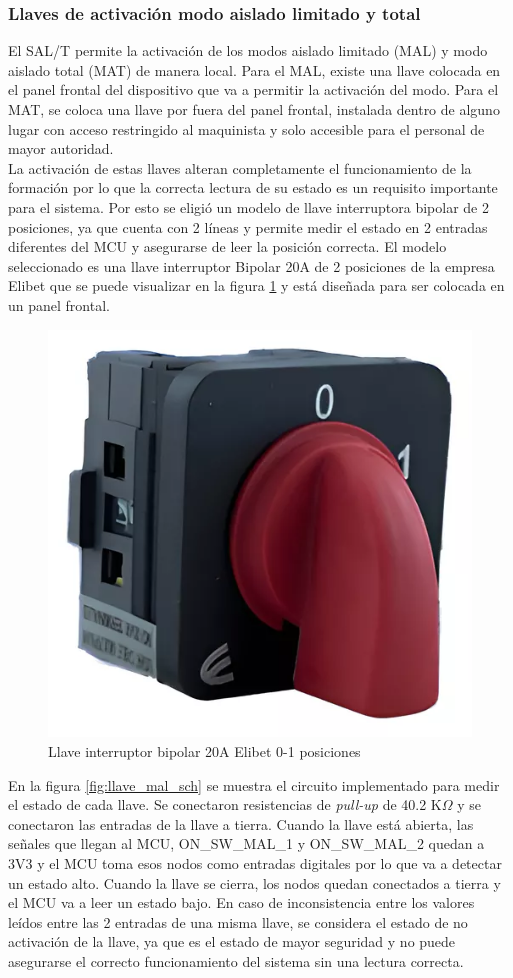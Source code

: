 \subsubsection{Llaves de activación modo aislado limitado y total}

El SAL/T permite la activación de los modos aislado limitado (MAL) y modo aislado total (MAT) de manera local. Para el MAL, existe una llave colocada en el panel frontal del dispositivo que va a permitir la activación del modo. Para el MAT, se coloca una llave por fuera del panel frontal, instalada dentro de alguno lugar con acceso restringido al maquinista y solo accesible para el personal de mayor autoridad.  \\

La activación de estas llaves alteran completamente el funcionamiento de la formación por lo que la correcta lectura de su estado es un requisito importante para el sistema. Por esto se eligió un modelo de llave interruptora bipolar de 2 posiciones, ya que cuenta con 2 líneas y permite medir el estado en 2 entradas diferentes del MCU y asegurarse de leer la posición correcta. El modelo seleccionado es una llave interruptor Bipolar 20A de 2 posiciones de la empresa Elibet \cite{llave_elibet} que se puede visualizar en la figura \ref{fig:llave_mal} y está diseñada para ser colocada en un panel frontal. 

\begin{figure}[H]
    \centering
    \includegraphics[width = 0.4\linewidth]{img/llave_mal.png}
    \caption{Llave interruptor bipolar 20A Elibet 0-1 posiciones}
    \label{fig:llave_mal}
\end{figure}

En la figura \ref{fig:llave_mal_sch} se muestra el circuito implementado para medir el estado de cada llave. Se conectaron resistencias de \textit{pull-up} de 40.2 K$\Omega$ y se conectaron las entradas de la llave a tierra. Cuando la llave está abierta, las señales que llegan al MCU, ON\_SW\_MAL\_1 y ON\_SW\_MAL\_2 quedan a 3V3 y el MCU toma esos nodos como entradas digitales por lo que va a detectar un estado alto. Cuando la llave se cierra, los nodos quedan conectados a tierra y el MCU va a leer un estado bajo. En caso de inconsistencia entre los valores leídos entre las 2 entradas de una misma llave, se considera el estado de no activación de la llave, ya que es el estado de mayor seguridad y no puede asegurarse el correcto funcionamiento del sistema sin una lectura correcta. 


